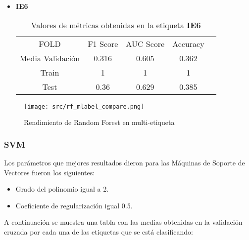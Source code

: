 \begin{itemize}
\begin{table}[H]
	      \end{table}
	\item  \textbf{IE6}
	      \begin{table}[H]
		      \centering
		      \begin{tabular}{|c|c|c|c|c}
			      \cline{1-4}
			      FOLD             & F1 Score & AUC Score & Accuracy \\ \cline{1-4}
			      Media Validación & 0.316    & 0.605     & 0.362    \\ \cline{1-4}
			      Train            & 1        & 1         & 1        \\ \cline{1-4}
			      Test             & 0.36     & 0.629     & 0.385    \\ \cline{1-4}
		      \end{tabular}
		      \caption{Valores de métricas obtenidas en la etiqueta \textbf{IE6}}
	      \end{table}
\end{itemize}

\begin{figure}[H]
	\centering
	\texttt{[image: src/rf\_mlabel\_compare.png]}
	\caption{Rendimiento de Random Forest en multi-etiqueta}
	\label{fig:rfml_cmp}
\end{figure}
\subsubsection*{SVM}
Los parámetros que mejores resultados dieron para las Máquinas de Soporte de Vectores fueron los siguientes:
\begin{itemize}
	\item Grado del polinomio igual a 2.
	\item Coeficiente de regularización igual 0.5.
\end{itemize}
A continuación se muestra una tabla con las medias obtenidas en la validación cruzada por cada una de las etiquetas que se está clasificando:

